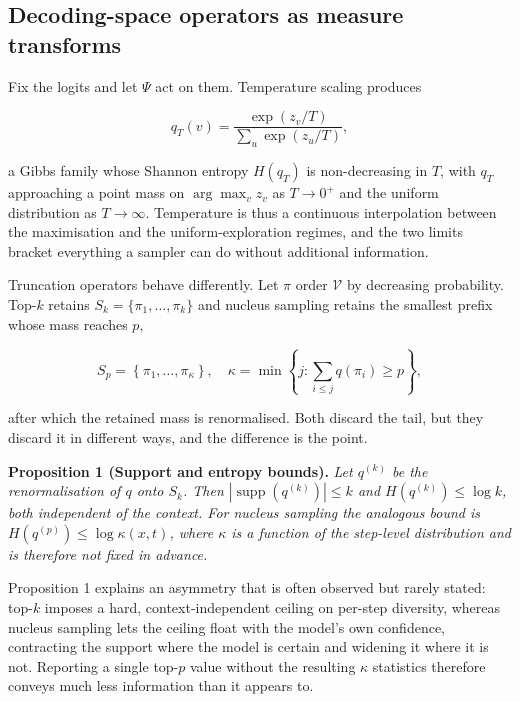 \documentclass[conference]{IEEEtran}
\begin{document}
\subsection{Decoding-space operators as measure transforms}
\label{sec:decoding-operators}

Fix the logits and let $\Psi$ act on them. Temperature scaling produces

\begin{equation}
q_{T}(v) = \frac{\exp(z_{v} / T)}{\sum_{u} \exp(z_{u} / T)},
\label{eq:temperature}
\end{equation}

a Gibbs family whose Shannon entropy $H(q_{T})$ is non-decreasing in $T$, with $q_{T}$ approaching a point mass on $\arg\max_{v} z_{v}$ as $T \to 0^{+}$ and the uniform distribution as $T \to \infty$. Temperature is thus a continuous interpolation between the maximisation and the uniform-exploration regimes, and the two limits bracket everything a sampler can do without additional information.

Truncation operators behave differently. Let $\pi$ order $\mathcal{V}$ by decreasing probability. Top-$k$ retains $S_{k} = \{\pi_{1}, \ldots, \pi_{k}\}$ and nucleus sampling retains the smallest prefix whose mass reaches $p$,

\begin{equation}
S_{p} = \left\{\pi_{1}, \dots, \pi_{\kappa}\right\}, \quad \kappa = \min\left\{j: \sum_{i \leq j} q(\pi_{i}) \geq p\right\},
\label{eq:nucleus}
\end{equation}

after which the retained mass is renormalised. Both discard the tail, but they discard it in different ways, and the difference is the point.

\textbf{Proposition 1 (Support and entropy bounds).} \textit{Let $q^{(k)}$ be the renormalisation of $q$ onto $S_k$. Then $|\operatorname{supp}(q^{(k)})| \leq k$ and $H(q^{(k)}) \leq \log k$, both independent of the context. For nucleus sampling the analogous bound is $H(q^{(p)}) \leq \log \kappa(x, t)$, where $\kappa$ is a function of the step-level distribution and is therefore not fixed in advance.}

Proposition 1 explains an asymmetry that is often observed but rarely stated: top-$k$ imposes a hard, context-independent ceiling on per-step diversity, whereas nucleus sampling lets the ceiling float with the model's own confidence, contracting the support where the model is certain and widening it where it is not. Reporting a single top-$p$ value without the resulting $\kappa$ statistics therefore conveys much less information than it appears to.
\end{document}
